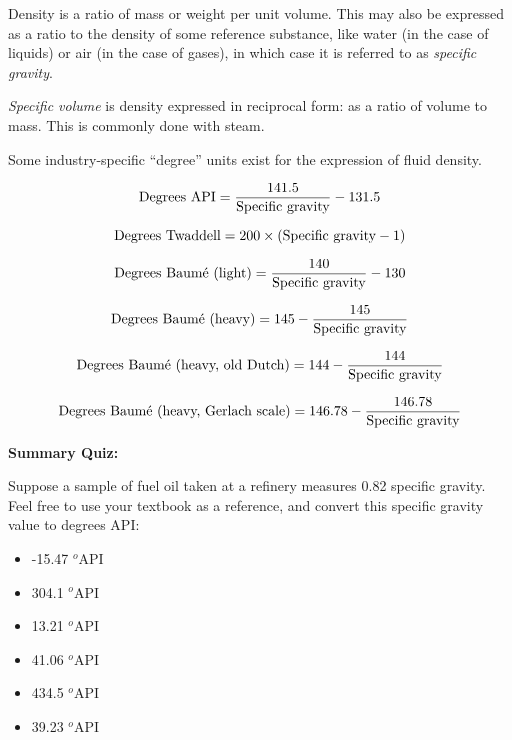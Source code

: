 Density is a ratio of mass or weight per unit volume.  This may also be expressed as a ratio to the density of some reference substance, like water (in the case of liquids) or air (in the case of gases), in which case it is referred to as {\it specific gravity}.

\vskip 10pt

{\it Specific volume} is density expressed in reciprocal form: as a ratio of volume to mass.  This is commonly done with steam.

\vskip 10pt

Some industry-specific ``degree'' units exist for the expression of fluid density.

$$\hbox{Degrees API} = {141.5 \over \hbox{Specific gravity}} - 131.5$$

$$\hbox{Degrees Twaddell} = 200 \times (\hbox{Specific gravity} - 1)$$

$$\hbox{Degrees Baum\'e (light)} = {140 \over \hbox{Specific gravity}} - 130$$

$$\hbox{Degrees Baum\'e (heavy)} = 145 - {145 \over \hbox{Specific gravity}}$$

$$\hbox{Degrees Baum\'e (heavy, old Dutch)} = 144 - {144 \over \hbox{Specific gravity}}$$

$$\hbox{Degrees Baum\'e (heavy, Gerlach scale)} = 146.78 - {146.78 \over \hbox{Specific gravity}}$$







\vfil \eject

\noindent
{\bf Summary Quiz:}

Suppose a sample of fuel oil taken at a refinery measures 0.82 specific gravity.  Feel free to use your textbook as a reference, and convert this specific gravity value to degrees API:


\begin{itemize}
\item{} -15.47 $^{o}$API 
\vskip 5pt 
\item{} 304.1 $^{o}$API 
\vskip 5pt 
\item{} 13.21 $^{o}$API 
\vskip 5pt 
\item{} 41.06 $^{o}$API
\vskip 5pt 
\item{} 434.5 $^{o}$API 
\vskip 5pt 
\item{} 39.23 $^{o}$API 
\end{itemize}




